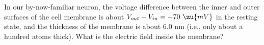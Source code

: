 In our by-now-familiar neuron, the voltage difference
        between the inner and outer surfaces of the cell membrane is
        about $V_{out}-V_{in}=-70\ \zu{mV}$ in the resting state, and the
        thickness of the membrane is about 6.0 nm (i.e., only about a
        hundred atoms thick).  What is the electric field inside the membrane?\answercheck
